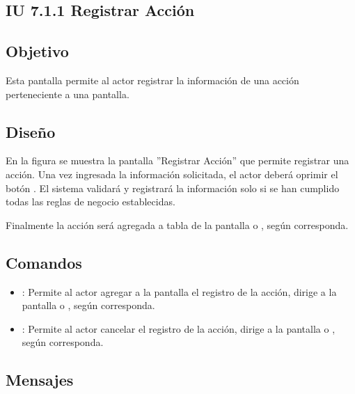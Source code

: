 \subsection{IU 7.1.1 Registrar Acción}

\subsection{Objetivo}
	Esta pantalla permite al actor registrar la información de una acción perteneciente a una pantalla.
\subsection{Diseño}
	En la figura  se muestra la pantalla ''Registrar Acción'' que permite registrar una acción.
	Una vez ingresada la información solicitada, el actor deberá oprimir el botón  . El sistema validará y registrará la información solo si se han cumplido todas las reglas de negocio establecidas.
	
	Finalmente la acción será agregada a tabla de la pantalla  o , según corresponda.

\subsection{Comandos}
\begin{itemize}
	\item {}: Permite al actor agregar a la pantalla el registro de la acción, dirige a la pantalla  o , según corresponda.
	\item {}: Permite al actor cancelar el registro de la acción, dirige a la pantalla  o , según corresponda.
\end{itemize}

\subsection{Mensajes}


